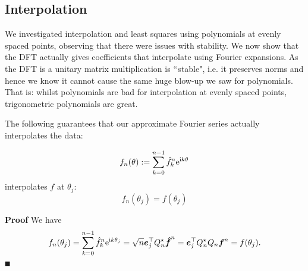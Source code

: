 \subsection{Interpolation}
We investigated  interpolation and least squares using polynomials at evenly spaced points, observing that there were issues with stability. We now show that the DFT actually gives coefficients that interpolate using Fourier expansions. As the DFT is a unitary matrix multiplication is \ensuremath{\ldq}stable", i.e. it preserves norms and hence we know it cannot cause the same huge blow-up we saw for polynomials. That is: whilst polynomials are bad for interpolation at evenly spaced points, trigonometric polynomials are great. 

The following guarantees that our approximate Fourier series actually interpolates the data:

\begin{corollary}[Interpolation]
\[
f_n(\theta) := \sum_{k=0}^{n-1} \hat f_k^n {\rm e}^{{\rm i} k \theta}
\]
interpolates $f$ at $\ensuremath{\theta}_j$:
\[
f_n(\ensuremath{\theta}_j) = f(\ensuremath{\theta}_j)
\]
\end{corollary}
\textbf{Proof} We have
\[
f_n(\theta_j) = \sum_{k=0}^{n-1} \hat f_k^n {\rm e}^{{\rm i} k \theta_j} = \sqrt n \bm{{\mbox{\boldmath$e$\unboldmath}}}_j^\top Q_n^\star {\mbox{\boldmath$\hat f$\unboldmath}}^n = \bm{{\mbox{\boldmath$e$\unboldmath}}}_j^\top Q_n^\star Q_n \bm{{\mbox{\boldmath$f$\unboldmath}}}^n = f(\theta_j).
\]
\ensuremath{\QED}

